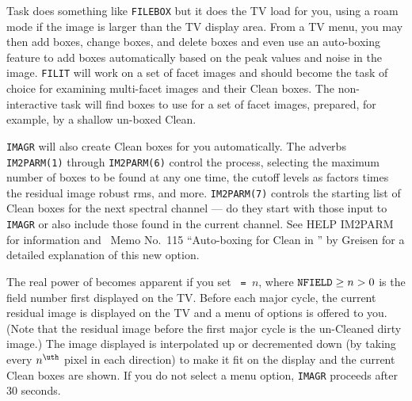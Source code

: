     Task {\tt {}} does something like {\tt FILEBOX} but it
does the TV load for you, using a roam mode if the image is larger
than the TV display area.  From a TV menu, you may then add boxes,
change boxes, and delete boxes and even use an auto-boxing feature to
add boxes automatically based on the peak values and noise in the
image.  {\tt FILIT} will work on a set of facet images and should
become the task of choice for examining multi-facet images and their
Clean boxes.  The non-interactive task {\tt {}} will find
boxes to use for a set of facet images, prepared, for example, by a
shallow un-boxed Clean.

     {\tt IMAGR} will also create Clean boxes for you automatically.
The adverbs {\tt IM2PARM(1)} through {\tt IM2PARM(6)} control the
process, selecting the maximum number of boxes to be found at any one
time, the cutoff levels as factors times the residual image robust
rms, and more.  {\tt IM2PARM(7)} controls the starting list of Clean
boxes for the next spectral channel --- do they start with those input
to {\tt IMAGR} or also include those found in the current channel.
See {\us HELP IM2PARM \CR} for information and \AIPS\ Memo No.~115
``Auto-boxing for Clean in \AIPS'' by Greisen for a detailed
explanation of this new option.

     The real power of {\tt {}} becomes apparent if you set
{\tt {} = $n$}, where ${\tt NFIELD} \ge n > 0$ is the field
number first displayed on the TV\@.  Before each major cycle, the
current residual image is displayed on the TV and a menu of options is
offered to you.  (Note that the residual image before the first major
cycle is the un-Cleaned dirty image.)  The image displayed is
interpolated up or decremented down (by taking every $n^{\uth}$ pixel
in each direction) to make it fit on the display and the current Clean
boxes are shown.  If you do not select a menu option, {\tt IMAGR}
proceeds after 30 seconds.

